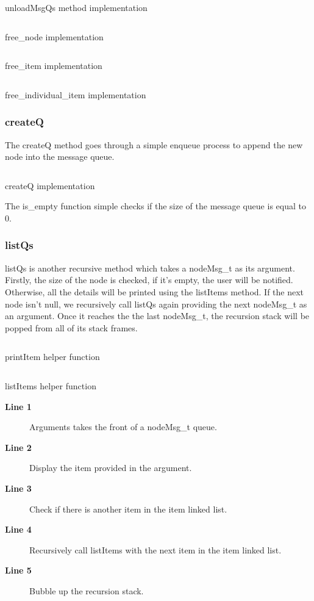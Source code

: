 \documentclass[a4paper, 12pt, titlepage]{article}
\newenvironment{code}{\captionsetup{type=listing}}{}
\newcommand{\sourcecode}[3]{
    \begin{code}
      \inputminted[linenos,numbersep=5pt,gobble=0,frame=lines,framesep=2mm,]{c}{#1}
        \caption{#2}
        \label{lst: #3}
    \end{code}
}
\begin{document}
\begin{onehalfspacing}
  \sourcecode{snippets/task2b/unloadMsgQs.c}{unloadMsgQs method implementation}{unloadMsgQs}
  \sourcecode{snippets/task2b/free_node.c}{free\_node implementation}{free_node}
  \sourcecode{snippets/task2b/free_item.c}{free\_item implementation}{free_item}
  \sourcecode{snippets/task2b/free_individual_item.c}{free\_individual\_item implementation}{free_ind_item}


  \subsubsection{createQ}
  The createQ method goes through a simple enqueue process to append the new node into the message queue.

  \sourcecode{snippets/task2b/createQ.c}{createQ implementation}{task2b_createQ}

  The is\_empty function simple checks if the size of the message queue is equal to 0.

  \clearpage

  \subsubsection{listQs}
  listQs is another recursive method which takes a nodeMsg\_t as its argument. Firstly, the size of the node is checked, if it's empty, the user will be notified. Otherwise, all the details will be printed using the listItems method. If the next node isn't null, we recursively call listQs again providing the next nodeMsg\_t as an argument. Once it reaches the the last nodeMsg\_t, the recursion stack will be popped from all of its stack frames.

  \sourcecode{snippets/task2b/printItem.c}{printItem helper function}{printItem}
  \sourcecode{snippets/task2b/listItems.c}{listItems helper function}{listItems}

  \begin{description}
  \item [\textbf{Line 1}] Arguments takes the front of a nodeMsg\_t queue.
  \item [\textbf{Line 2}] Display the item provided in the argument.
  \item [\textbf{Line 3}] Check if there is another item in the item linked list.
  \item [\textbf{Line 4}] Recursively call listItems with the next item in the item linked list.
  \item [\textbf{Line 5}] Bubble up the recursion stack.
  \end{description}
  \clearpage


\end{onehalfspacing}
\end{document}
